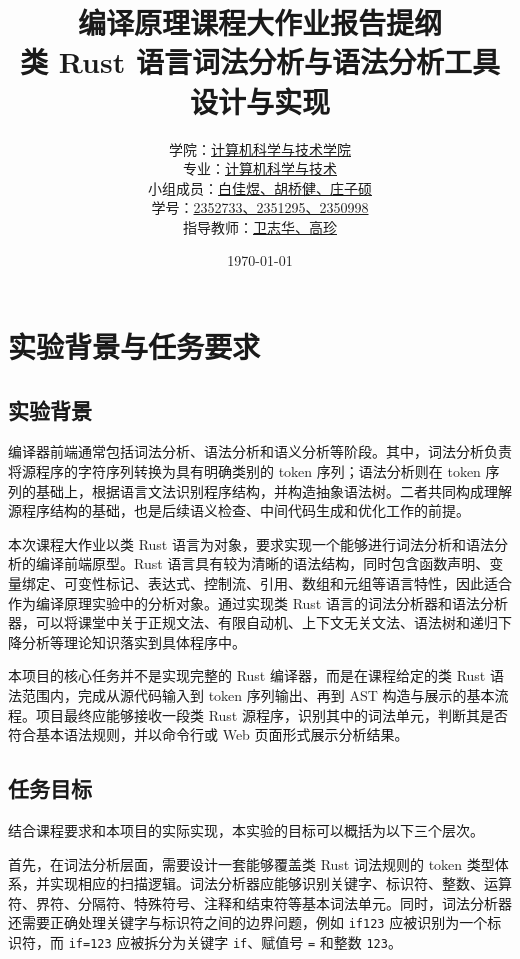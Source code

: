 \documentclass[UTF8,a4paper,12pt]{ctexart}
\title{
    \heiti 编译原理课程大作业报告提纲\\
    \Large 类 Rust 语言词法分析与语法分析工具设计与实现
}
\author{
    学院：\underline{计算机科学与技术学院} \\
    专业：\underline{计算机科学与技术} \\
    小组成员：\underline{白佳煜、胡桥健、庄子硕} \\
    学号：\underline{2352733、2351295、2350998} \\
    指导教师：\underline{卫志华、高珍}
}
\date{\today}
\begin{document}
\maketitle
\thispagestyle{empty}

\newpage

\tableofcontents

\newpage


\section{实验背景与任务要求}

\subsection{实验背景}

编译器前端通常包括词法分析、语法分析和语义分析等阶段。其中，词法分析负责将源程序的字符序列转换为具有明确类别的 token 序列；语法分析则在 token 序列的基础上，根据语言文法识别程序结构，并构造抽象语法树。二者共同构成理解源程序结构的基础，也是后续语义检查、中间代码生成和优化工作的前提。

本次课程大作业以类 Rust 语言为对象，要求实现一个能够进行词法分析和语法分析的编译前端原型。Rust 语言具有较为清晰的语法结构，同时包含函数声明、变量绑定、可变性标记、表达式、控制流、引用、数组和元组等语言特性，因此适合作为编译原理实验中的分析对象。通过实现类 Rust 语言的词法分析器和语法分析器，可以将课堂中关于正规文法、有限自动机、上下文无关文法、语法树和递归下降分析等理论知识落实到具体程序中。

本项目的核心任务并不是实现完整的 Rust 编译器，而是在课程给定的类 Rust 语法范围内，完成从源代码输入到 token 序列输出、再到 AST 构造与展示的基本流程。项目最终应能够接收一段类 Rust 源程序，识别其中的词法单元，判断其是否符合基本语法规则，并以命令行或 Web 页面形式展示分析结果。

\subsection{任务目标}

结合课程要求和本项目的实际实现，本实验的目标可以概括为以下三个层次。

首先，在词法分析层面，需要设计一套能够覆盖类 Rust 词法规则的 token 类型体系，并实现相应的扫描逻辑。词法分析器应能够识别关键字、标识符、整数、运算符、界符、分隔符、特殊符号、注释和结束符等基本词法单元。同时，词法分析器还需要正确处理关键字与标识符之间的边界问题，例如 \texttt{if123} 应被识别为一个标识符，而 \texttt{if=123} 应被拆分为关键字 \texttt{if}、赋值号 \texttt{=} 和整数 \texttt{123}。
\end{document}
